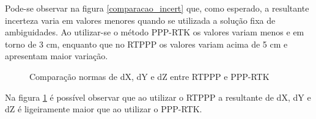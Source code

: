 Pode-se observar na figura \ref{comparacao_incert} que, como esperado, a resultante incerteza varia em valores menores quando se utilizada a solução fixa de ambiguidades. Ao utilizar-se o método PPP-RTK os valores variam menos e em torno de 3 cm, enquanto que no RTPPP os valores variam acima de 5 cm e apresentam maior variação.

\begin{figure}[H]
\centering
{}
\caption{Comparação normas de dX, dY e dZ entre RTPPP e PPP-RTK}
\label{comparacao_xyz}
\end{figure}

Na figura \ref{comparacao_xyz} é possível observar que ao utilizar o RTPPP a resultante de dX, dY e dZ é ligeiramente maior que ao utilizar o PPP-RTK.

